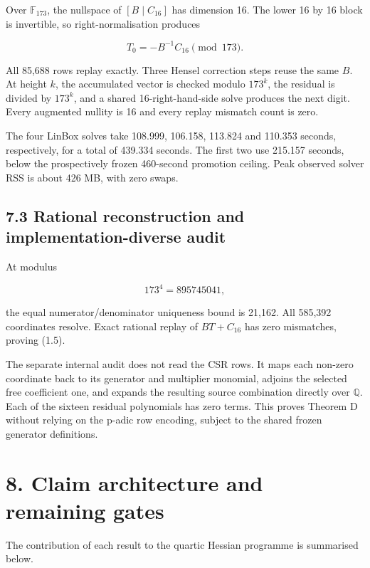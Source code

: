 \documentclass[
  11pt,
]{article}
\begin{document}
Over \(\mathbb F_{173}\), the nullspace of \([B\mid C_{16}]\) has
dimension 16. The lower 16 by 16 block is invertible, so
right-normalisation produces

\[
T_0=-B^{-1}C_{16}\pmod {173}.
\]

All 85,688 rows replay exactly. Three Hensel correction steps reuse the
same \(B\). At height \(k\), the accumulated vector is checked modulo
\(173^k\), the residual is divided by \(173^k\), and a shared
16-right-hand-side solve produces the next digit. Every augmented
nullity is 16 and every replay mismatch count is zero.

The four LinBox solves take 108.999, 106.158, 113.824 and 110.353
seconds, respectively, for a total of 439.334 seconds. The first two use
215.157 seconds, below the prospectively frozen 460-second promotion
ceiling. Peak observed solver RSS is about 426 MB, with zero swaps.

\subsection{7.3 Rational reconstruction and implementation-diverse
audit}\label{rational-reconstruction-and-implementation-diverse-audit}

At modulus

\[
173^4=895745041,
\]

the equal numerator/denominator uniqueness bound is 21,162. All 585,392
coordinates resolve. Exact rational replay of \(BT+C_{16}\) has zero
mismatches, proving (1.5).

The separate internal audit does not read the CSR rows. It maps each
non-zero coordinate back to its generator and multiplier monomial,
adjoins the selected free coefficient one, and expands the resulting
source combination directly over \(\mathbb Q\). Each of the sixteen
residual polynomials has zero terms. This proves Theorem D without
relying on the p-adic row encoding, subject to the shared frozen
generator definitions.

\section{8. Claim architecture and remaining
gates}\label{claim-architecture-and-remaining-gates}

The contribution of each result to the quartic Hessian programme is
summarised below.
\end{document}
